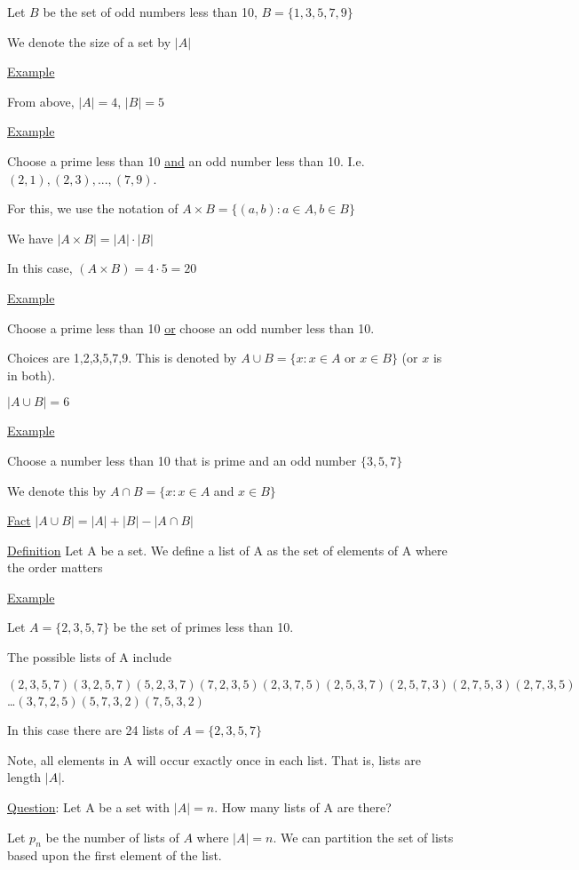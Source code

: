 \documentclass{article}
\begin{document}
Let $B$ be the set of odd numbers less than 10, $B = \{1,3,5,7,9\}$

We denote the size of a set by $|A|$

\underline{Example}

From above, $|A|= 4$, $|B| = 5$

\underline{Example}

Choose a prime less than 10 \underline{and} an odd number less than 10. I.e. $(2,1),(2,3),...,(7,9)$.

For this, we use the notation of $A \times B = \{(a,b): a \in A, b \in B\}$

We have $|A \times B| = |A| \cdot |B|$

In this case, $(A \times B) = 4 \cdot 5 = 20$

\underline{Example}

Choose a prime less than 10 \underline{or} choose an odd number less than 10. 

Choices are 1,2,3,5,7,9. This is denoted by $A \cup B = \{x: x \in A$  or  $x \in B \}$ (or $x$ is in both).  

$|A \cup B| = 6$

\underline{Example}

Choose a number less than 10 that is prime and an odd number $\{3,5,7\}$

We denote this by $A \cap B = \{x: x \in A$ and $x \in B\}$ 

\underline{Fact} $|A \cup B| = |A| + |B| - |A \cap B|$

\underline{Definition} Let A be a set. We define a list of A as the set of elements of A where the order matters

\underline{Example}

Let $A = \{2,3,5,7\}$ be the set of primes less than 10. 

The possible lists of A include

$(2,3,5,7)(3,2,5,7)(5,2,3,7)(7,2,3,5)(2,3,7,5)(2,5,3,7)(2,5,7,3)(2,7,5,3)(2,7,3,5)$\ldots$(3,7,2,5) (5,7,3,2)(7,5,3,2)$

In this case there are 24 lists of $A = \{2,3,5,7\}$

Note, all elements in A will occur exactly once in each list. That is, lists are length $|A|$. 

\underline{Question}: Let A be a set with $|A| = n$. How many lists of A are there?

Let $p_n$ be the number of lists of $A$ where $|A| = n$. We can partition the set of lists based upon the first element of the list. 
\end{document}
